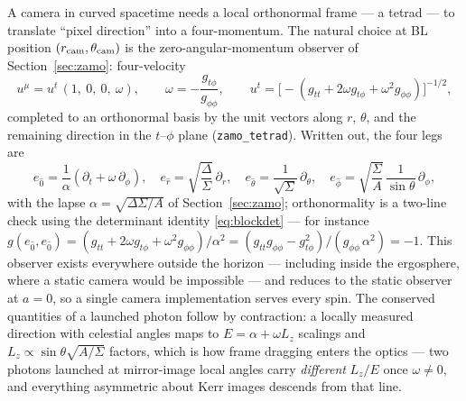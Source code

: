 A camera in curved spacetime needs a local orthonormal frame — a tetrad
— to translate ``pixel direction'' into a four-momentum. The natural
choice at BL position $(r_{\rm cam}, \theta_{\rm cam})$ is the
zero-angular-momentum observer of Section~\ref{sec:zamo}: four-velocity
\begin{equation}
u^\mu = u^t\,(1,\ 0,\ 0,\ \omega), \qquad
\omega = -\frac{g_{t\phi}}{g_{\phi\phi}}, \qquad
u^t = \bigl[-(g_{tt} + 2\omega g_{t\phi} +
\omega^2 g_{\phi\phi})\bigr]^{-1/2},
\label{eq:zamofourvel}
\end{equation}
completed to an orthonormal basis by the unit vectors along $r$,
$\theta$, and the remaining direction in the $t$--$\phi$ plane
(\texttt{zamo\_tetrad}). Written out, the four legs are
\begin{equation}
e_{\hat 0} = \frac{1}{\alpha}\left(\partial_t + \omega\,
\partial_\phi\right),
\quad
e_{\hat r} = \sqrt{\frac{\Delta}{\Sigma}}\,\partial_r,
\quad
e_{\hat\theta} = \frac{1}{\sqrt{\Sigma}}\,\partial_\theta,
\quad
e_{\hat\phi} = \sqrt{\frac{\Sigma}{A}}\,
\frac{1}{\sin\theta}\,\partial_\phi,
\label{eq:zamotetrad}
\end{equation}
with the lapse $\alpha = \sqrt{\Delta\Sigma/A}$ of
Section~\ref{sec:zamo}; orthonormality is a two-line check using the
determinant identity \eqref{eq:blockdet} — for instance
$g(e_{\hat 0}, e_{\hat 0}) = (g_{tt} + 2\omega g_{t\phi} + \omega^2
g_{\phi\phi})/\alpha^2 = (g_{tt}g_{\phi\phi} -
g_{t\phi}^2)/(g_{\phi\phi}\,\alpha^2) = -1$. This observer exists
everywhere outside the
horizon — including inside the ergosphere, where a static camera would
be impossible — and reduces to the static observer at $a = 0$, so a
single camera implementation serves every spin. The conserved
quantities of a launched photon follow by contraction: a locally
measured direction with celestial angles maps to
$E = \alpha + \omega L_z$ scalings and $L_z \propto
\sin\theta\sqrt{A/\Sigma}$ factors, which is how frame dragging enters
the optics — two photons launched at mirror-image local angles carry
\emph{different} $L_z/E$ once $\omega \neq 0$, and everything
asymmetric about Kerr images descends from that line.


